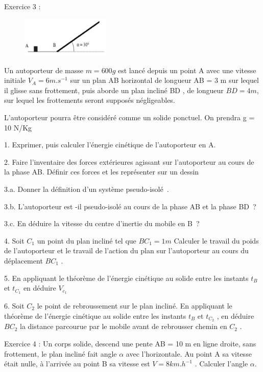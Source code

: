 \documentclass[12pt, french]{article}
\begin{document}
\begin{Box2}{Exercice 3 :}
\begin{figure}
  \begin{center}
    \includegraphics[width=0.38\textwidth]{./img/img00.png}
  \end{center}
\end{figure}
   Un autoporteur de masse $m = 600g$ est lancé depuis un point A avec une vitesse initiale $V_A = 6 m.s^{-1}$ sur un plan AB horizontal de longueur AB = 3 m sur lequel il glisse sans frottement, puis aborde un plan incliné BD , de
longueur $BD = 4 m$, sur lequel les frottements seront supposés négligeables.

L’autoporteur pourra être considéré comme un solide ponctuel. On prendra g = 10 N/Kg

1. Exprimer, puis calculer l’énergie cinétique de l’autoporteur en A.

2. Faire l’inventaire des forces extérieures agissant sur l’autoporteur au cours de la phase AB. Définir ces forces et les représenter sur un dessin

3.a. Donner la définition d’un système pseudo-isolé .

3.b. L’autoporteur est -il pseudo-isolé au cours de la phase AB et la phase BD ?

3.c. En déduire la vitesse du centre d’inertie du mobile en B ?

4. Soit $C_1$ un point du plan incliné tel que $BC_1 = 1 m$ Calculer le travail du poids de l’autoporteur et le travail de l’action du plan sur l’autoporteur au cours du
déplacement $BC_1$ .

   5. En appliquant le théorème de l’énergie cinétique au solide entre les instants $t_B$ et $t_{C_1}$ en déduire $V_{c_1}$

   6. Soit $C_2$ le point de rebroussement sur le plan incliné. En appliquant le théorème de l’énergie cinétique au solide entre les instants $t_B$ et $t_{C_2}$ , en déduire $BC_2$ la distance parcourue par le mobile avant de rebrousser chemin en $C_2$ .
\end{Box2}

\begin{Box2}{Exercice 4 : }
Un corps solide, descend une pente
AB = 10 m en ligne droite, sans frottement,
le plan incliné fait angle $\alpha$ avec l’horizontale.
Au point A sa vitesse était nulle, à l’arrivée au point B sa vitesse est $V= 8 km.h^{-1}$ .
Calculer l’angle $\alpha$.
\end{Box2}
\end{document}
